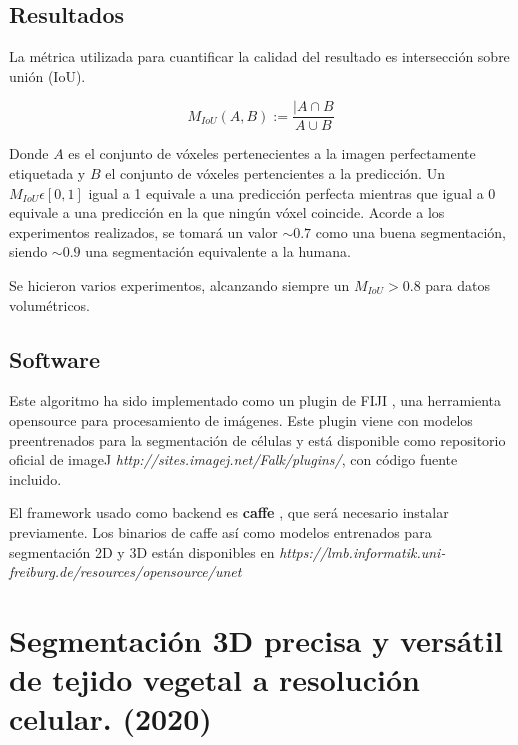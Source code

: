 \subsection{Resultados}


La métrica utilizada para cuantificar la calidad del resultado es intersección sobre unión (IoU).

\begin{equation}
M_{IoU}(A, B) := \frac{|A\cap B}{A\cup B}
\end{equation}

Donde $A$ es el conjunto de vóxeles pertenecientes a la imagen perfectamente etiquetada y $B$ el conjunto de vóxeles pertencientes a la predicción. Un $M_{IoU}\epsilon[0,1]$ igual a 1 equivale a una predicción perfecta mientras que igual a 0 equivale a una predicción en la que ningún vóxel coincide.
Acorde a los experimentos realizados, se tomará un valor $\sim0.7$ como una buena segmentación, siendo $\sim0.9$ una segmentación equivalente a la humana.

Se hicieron varios experimentos, alcanzando siempre un $M_{IoU}>0.8$ para datos volumétricos.

\subsection{Software}

Este algoritmo ha sido implementado como un plugin de FIJI \cite{Schindelin2012}, una herramienta opensource para procesamiento de imágenes. Este plugin viene con modelos preentrenados para la segmentación de células y está disponible como repositorio oficial de imageJ \textit{http://sites.imagej.net/Falk/plugins/}, con código fuente incluido.

El framework usado como backend es \textbf{caffe} \cite{Jia2014}, que será necesario instalar previamente. Los binarios de caffe así como modelos entrenados para segmentación 2D y 3D están disponibles en \textit{https://lmb.informatik.uni-freiburg.de/resources/opensource/unet}

\section{Segmentación 3D precisa y versátil de tejido vegetal a resolución celular. (2020)}


